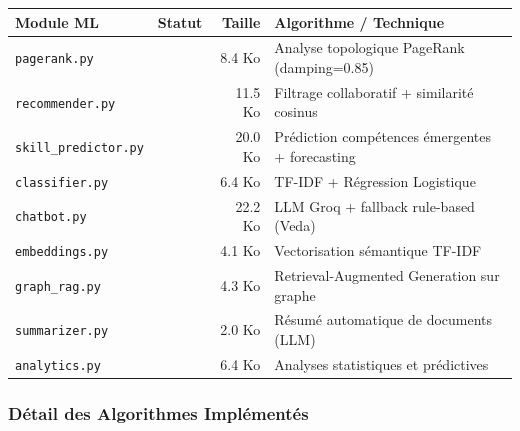 \documentclass[12pt,a4paper]{article}
\newcommand{\cmark}{\textcolor{vert}{\ding{51}}}
\begin{document}
\begin{center}
\renewcommand{\arraystretch}{1.3}
\begin{tabular}{|l|c|r|l|}
\hline
\rowcolor{bleu!15}
\textbf{Module ML} & \textbf{Statut} & \textbf{Taille} & \textbf{Algorithme / Technique} \\
\hline
\texttt{pagerank.py} & \cmark & 8.4 Ko & Analyse topologique PageRank (damping=0.85) \\
\hline
\texttt{recommender.py} & \cmark & 11.5 Ko & Filtrage collaboratif + similarité cosinus \\
\hline
\texttt{skill\_predictor.py} & \cmark & 20.0 Ko & Prédiction compétences émergentes + forecasting \\
\hline
\texttt{classifier.py} & \cmark & 6.4 Ko & TF-IDF + Régression Logistique \\
\hline
\texttt{chatbot.py} & \cmark & 22.2 Ko & LLM Groq + fallback rule-based (Veda) \\
\hline
\texttt{embeddings.py} & \cmark & 4.1 Ko & Vectorisation sémantique TF-IDF \\
\hline
\texttt{graph\_rag.py} & \cmark & 4.3 Ko & Retrieval-Augmented Generation sur graphe \\
\hline
\texttt{summarizer.py} & \cmark & 2.0 Ko & Résumé automatique de documents (LLM) \\
\hline
\texttt{analytics.py} & \cmark & 6.4 Ko & Analyses statistiques et prédictives \\
\hline
\end{tabular}
\end{center}

\subsubsection{Détail des Algorithmes Implémentés}
\end{document}
